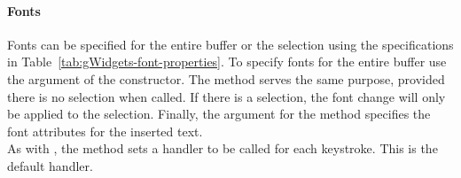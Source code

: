 \paragraph{Fonts}
Fonts can be specified for the entire buffer or the selection using
the specifications in Table~\ref{tab:gWidgets-font-properties}. To
specify fonts for the entire buffer use the
 argument of the constructor. The
 method serves the same purpose, provided
there is no selection when called. If there is a selection, the font
change will only be applied to the selection. Finally, the
 argument for the  method
specifies the font attributes for the inserted text.
\\


As with , the  method
sets a handler to be called for each keystroke. This is the default
handler.


